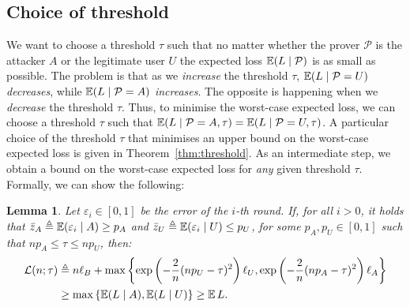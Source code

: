 \documentclass[a4paper]{article}
\newcommand \techreport[1]{#1}
\newcommand \ieeetrans[1]{}
\newcommand \defn {\mathrel{\triangleq}}
\newcommand \ELb {\mathcal{L}}
\newcommand\E{\mathop{\mbox{\ensuremath{\mathbb{E}}}}\nolimits}
\newcommand \thr {\tau}
\newcommand \err {\varepsilon}
\newcommand \loss {L}
\newcommand \pa {p_A}
\newcommand \pu {p_U}
\newcommand \LA {\ell_A}
\newcommand \LU {\ell_U}
\newcommand \LB {\ell_B}
\newcommand \auth {\mathcal{P}}
\theoremstyle{plain} \newtheorem{remark}{Remark}
\theoremstyle{plain} \newtheorem{definition}{Definition}
\theoremstyle{plain} \newtheorem{example}{Example}
\theoremstyle{plain} \newtheorem{assumption}{Assumption}
\theoremstyle{plain} \newtheorem{conjecture}{Conjecture}
\theoremstyle{plain} \newtheorem{theorem}{Theorem}
\theoremstyle{plain} \newtheorem{proposition}{Proposition}
\theoremstyle{plain} \newtheorem{lemma}{Lemma}
\theoremstyle{plain} \newtheorem{corollary}{Corollary}
\begin{document}
\subsection{Choice of threshold}
\label{sec:threshold-choice}
We want to choose a threshold $\tau$ such that no matter whether the
prover $\auth$ is the attacker $A$ or the legitimate user $U$ the
expected loss $\E (\loss \mid \auth)$ is as small as possible.  The
problem is that as we \textit{increase} the threshold $\tau$,
$\E(\loss \mid \auth=U)$ \textit{decreases}, while $\E(\loss \mid
\auth=A)$ \textit{increases}. The opposite is happening when we
\textit{decrease} the threshold $\tau$.  Thus, to minimise the
worst-case expected loss, we can choose a threshold $\tau$ such that
$\E(\loss \mid \auth=A, \tau) =\E(\loss \mid \auth=U, \tau)$.  A
particular choice of the threshold $\tau$ that minimises an upper
bound on the worst-case expected loss is given in
Theorem~\ref{thm:threshold}.  As an intermediate step, we obtain a
bound on the worst-case expected loss for {\em any} given threshold
$\tau$. Formally, we can show the following:
\begin{lemma}
  Let $\err_i \in [0,1]$ be the error of the $i$-th round.  If, for all
  $i > 0$, it holds that $\bar{z}_A \defn \E(\err_i \mid A) \geq \pa$
  and $\bar{z}_U \defn \E(\err_i \mid U) \leq \pu$, for some $\pa, \pu
  \in [0,1]$ such that $n\pa \leq \thr \leq n\pu$, then:
\begin{align}
    \ELb(n;\thr)
    &\defn n\LB +
    \techreport{\max\left\{\exp\left(-\frac{2}{n}(n\pu - \thr)^2\right) \LU,
      \exp\left(-\frac{2}{n}(n\pa - \thr)^2\right)  \LA\right\}}
    \ieeetrans{\max\left\{e^{-\frac{2}{n}(n\pu - \thr)^2} \LU,
      e^{-\frac{2}{n}(n\pa - \thr)^2}  \LA\right\}}
 \nonumber
 \\
 &
    \geq \max \left\{ \E(\loss \mid A), \E(\loss \mid U)\right\}
    \geq \E \loss.     \label{eq:hoeffding-loss-bound}
  \end{align}
\end{lemma}
\end{document}
